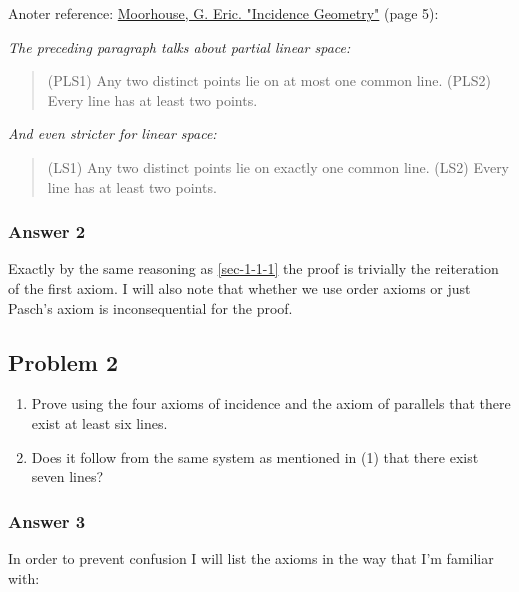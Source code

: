 \documentclass[11pt]{article}
\begin{document}
Anoter reference: \href{http://www.uwyo.edu/moorhouse/handouts/incidence_geometry.pdf}{Moorhouse, G. Eric. "Incidence Geometry"} (page 5):

\emph{The preceding paragraph talks about partial linear space:}

\begin{quote}
(PLS1) Any two distinct points lie on at most one common line.
(PLS2) Every line has at least two points.
\end{quote}

\emph{And even stricter for linear space:}
\begin{quote}
(LS1) Any two distinct points lie on exactly one common line.
(LS2) Every line has at least two points.
\end{quote}
\subsubsection{Answer 2}
\label{sec-1-1-2}
Exactly by the same reasoning as \ref{sec-1-1-1} the proof is trivially the
reiteration of the first axiom.  I will also note that whether we use
order axioms or just Pasch's axiom is inconsequential for the proof.
\subsection{Problem 2}
\label{sec-1-2}
\begin{enumerate}
\item Prove using the four axioms of incidence and the axiom of parallels 
that there exist at least six lines.
\item Does it follow from the same system as mentioned in (1) that there
exist seven lines?
\end{enumerate}

\subsubsection{Answer 3}
\label{sec-1-2-1}
In order to prevent confusion I will list the axioms in the way that
I'm familiar with:
\end{document}
